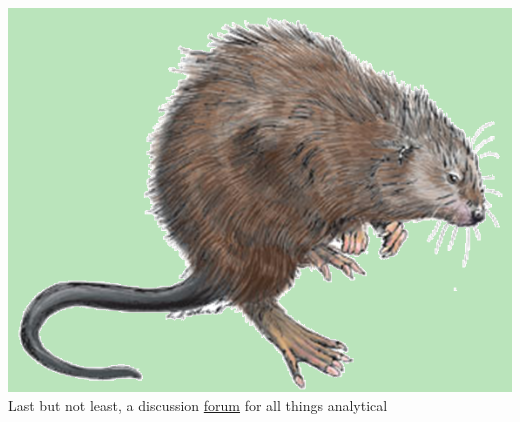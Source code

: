 \documentclass[serif]{beamer}\usepackage[]{graphicx}\usepackage[]{color}
\begin{document}
\begin{frame}[fragile]{\includegraphics[width=0.05\paperwidth]{fig/muskrat.png}\hspace{0.07in}{\bf SWMPrats.net: Forum}}
Last but not least, a discussion \href{http://swmprats.net/forum}{forum} for all things analytical \\~\\
\centerline{}
\end{frame}
\end{document}
